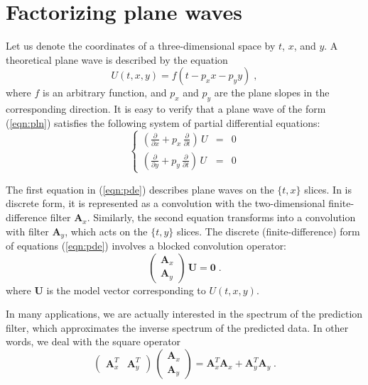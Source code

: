 \section{Factorizing plane waves}

Let us denote the coordinates of a three-dimensional space by $t$,
$x$, and $y$.  A theoretical plane wave is described by the equation
\begin{equation}
\label{eqn:pln}
U(t,x,y) = f (t - p_x x - p_y y)\;,
\end{equation}
where $f$ is an arbitrary function, and $p_x$ and $p_y$ are the plane
slopes in the corresponding direction. It is easy to verify that a
plane wave of the form (\ref{eqn:pln}) satisfies the following system
of partial differential equations:
\begin{equation}
\label{eqn:pde}
\left\{\begin{array}{rcl}\displaystyle
\left(\frac{\partial}{\partial x} + p_x\,\frac{\partial}{\partial t}\right)\,U
& = & 0 \\ \displaystyle
\left(\frac{\partial}{\partial y} + p_y\,\frac{\partial}{\partial t}\right)\,U
& = & 0
\end{array}\right.
\end{equation}
\par
The first equation in (\ref{eqn:pde}) describes plane waves on the
$\{t,x\}$ slices.  In is discrete form, it is represented as a
convolution with the two-dimensional finite-difference filter
$\mathbf{A}_x$. Similarly, the second equation transforms into a
convolution with filter $\mathbf{A}_y$, which acts on the $\{t,y\}$
slices. The discrete (finite-difference) form of equations
(\ref{eqn:pde}) involves a blocked convolution operator:
\begin{equation}
\label{eqn:cnv}
\left(\begin{array}{c}\displaystyle
\mathbf{A}_x \\
\mathbf{A}_y
\end{array}\right)\,\mathbf{U} = \mathbf{0}\;.
\end{equation}
where $\mathbf{U}$ is the model vector corresponding to $U(t,x,y)$.
\par
In many applications, we are actually interested in the spectrum of
the prediction filter, which approximates the inverse spectrum of the
predicted data. In other words, we deal with the square operator
\begin{equation}
\label{eqn:ata}
\left(\begin{array}{cc}\displaystyle \mathbf{A}_x^T & \mathbf{A}_y^T
      \end{array}\right)\,
\left(\begin{array}{c}\displaystyle
\mathbf{A}_x \\
\mathbf{A}_y
\end{array}\right) = 
\mathbf{A}_x^T \mathbf{A}_x + \mathbf{A}_y^T \mathbf{A}_y\;.
\end{equation}

